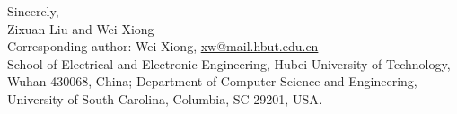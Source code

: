 \documentclass[11pt,a4paper]{article}
\begin{document}
Sincerely,\\
Zixuan Liu and Wei Xiong\\
Corresponding author: Wei Xiong, \href{mailto:xw@mail.hbut.edu.cn}{xw@mail.hbut.edu.cn}\\
School of Electrical and Electronic Engineering, Hubei University of Technology, Wuhan 430068, China; Department of Computer Science and Engineering, University of South Carolina, Columbia, SC 29201, USA.
\end{document}
